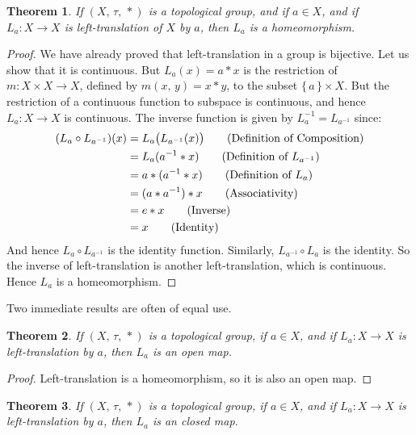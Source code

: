 \documentclass{article}
\theoremstyle{plain}
\newtheorem{theorem}{Theorem}[section]
\theoremstyle{normal}
\begin{document}
        \begin{theorem}
            If $(X,\,\tau,\,*)$ is a topological group, and if $a\in{X}$,
            and if $L_{a}:X\rightarrow{X}$ is left-translation of $X$ by $a$,
            then $L_{a}$ is a homeomorphism.
        \end{theorem}
        \begin{proof}
            We have already proved that left-translation in a group is
            bijective. Let us show that it is continuous. But
            $L_{a}(x)=a*x$ is the restriction of
            $m:X\times{X}\rightarrow{X}$, defined by $m(x,\,y)=x*y$, to the
            subset $\{\,a\,\}\times{X}$. But the restriction of a continuous
            function to subspace is continuous, and hence
            $L_{a}:X\rightarrow{X}$ is continuous. The inverse function
            is given by $L_{a}^{-1}=L_{a^{-1}}$ since:
            \begin{align}
                (L_{a}\circ{L}_{a^{-1}})(x)
                &=L_{a}\big(L_{a^{-1}}(x)\big)\tag{Definition of Composition}\\
                &=L_{a}(a^{-1}*x)\tag{Definition of $L_{a^{-1}}$}\\
                &=a*(a^{-1}*x)\tag{Definition of $L_{a}$}\\
                &=(a*a^{-1})*x\tag{Associativity}\\
                &=e*x\tag{Inverse}\\
                &=x\tag{Identity}
            \end{align}
            And hence $L_{a}\circ{L}_{a^{-1}}$ is the identity function.
            Similarly, $L_{a^{-1}}\circ{L}_{a}$ is the identity. So the
            inverse of left-translation is another left-translation, which is
            continuous. Hence $L_{a}$ is a homeomorphism.
        \end{proof}
        Two immediate results are often of equal use.
        \begin{theorem}
            If $(X,\,\tau,\,*)$ is a topological group, if $a\in{X}$, and if
            $L_{a}:X\rightarrow{X}$ is left-translation by $a$, then
            $L_{a}$ is an open map.
        \end{theorem}
        \begin{proof}
            Left-translation is a homeomorphism, so it is also an open map.
        \end{proof}
        \begin{theorem}
            If $(X,\,\tau,\,*)$ is a topological group, if $a\in{X}$, and if
            $L_{a}:X\rightarrow{X}$ is left-translation by $a$, then
            $L_{a}$ is an closed map.
        \end{theorem}
\end{document}
